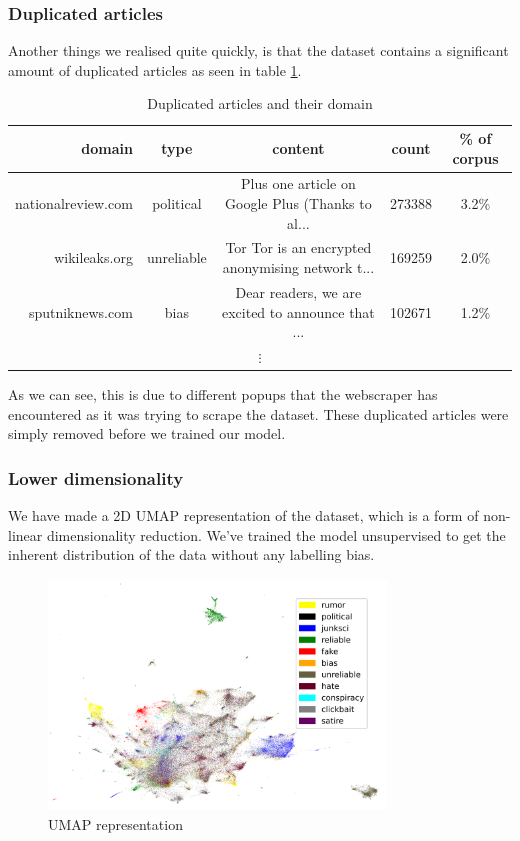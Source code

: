 \subsubsection{Duplicated articles}\label{sec:dup_articles}
Another things we realised quite quickly, is that the dataset contains a significant amount of duplicated articles as
seen in table \ref{tab:dupart}.

\begin{table}[htpb]
  \centering
  \caption{Duplicated articles and their domain}
  \label{tab:dupart}
  \begin{tabular}{r | c | c| c| c}
      domain & type & content & count&\% of corpus \\ \hline
      nationalreview.com & political & Plus one article on Google Plus (Thanks to al... & 273388 & 3.2\%\\ \hline
      wikileaks.org & unreliable & Tor Tor is an encrypted anonymising network t... & 169259 & 2.0\% \\ \hline
      sputniknews.com & bias & Dear readers, we are excited to announce that ... & 102671 & 1.2\%\\
    \multicolumn{5}{c}{$\vdots$}
  \end{tabular}
\end{table}
As we can see, this is due to different popups that the webscraper has encountered as it
was trying to scrape the dataset. These duplicated articles were simply removed before we trained our model.

\subsubsection{Lower dimensionality}
We have made a 2D UMAP representation of the dataset, which is a form of non-linear dimensionality reduction. We've
trained the model unsupervised to get the inherent distribution of the data without any labelling bias.
\begin{figure}[htpb]
  \centering
  \includegraphics[width=0.8\textwidth]{figures/umapFakeNewsClasses}
  \caption{UMAP representation}
  \label{fig:umap_explore}
\end{figure}

